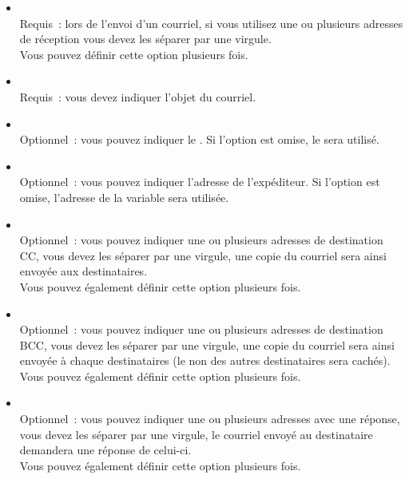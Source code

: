 \begin {itemize}
  \item [\var{-t},]  
    \\Requis~: lors de l'envoi d'un courriel, si vous utilisez une ou
	plusieurs adresses de réception vous devez les séparer par une virgule.
	\\Vous pouvez définir cette option plusieurs fois.

  \item [\var{-s},]  
    \\Requis~: vous devez indiquer l'objet du courriel.

  \item [\var{-A},]  
    \\Optionnel~: vous pouvez indiquer le .
	Si l'option est omise, le  
	sera utilisé.

  \item [\var{-f},]  
    \\Optionnel~: vous pouvez indiquer l'adresse de l'expéditeur.
	Si l'option est omise, l'adresse de la variable
	 sera utilisée.

  \item [\var{-c},]  
    \\Optionnel~: vous pouvez indiquer une ou plusieurs adresses de destination CC,
	vous devez les séparer par une virgule, une copie du courriel sera ainsi
	envoyée aux destinataires.
	\\Vous pouvez également définir cette option plusieurs fois.

  \item [\var{-b},]  
    \\Optionnel~: vous pouvez indiquer une ou plusieurs adresses de destination BCC,
	vous devez les séparer par une virgule, une copie du courriel sera ainsi
	envoyée à chaque destinataires (le non des autres destinataires sera cachés).
	\\Vous pouvez également définir cette option plusieurs fois.

  \item [\var{-r},]  
    \\Optionnel~: vous pouvez indiquer une ou plusieurs adresses avec une réponse,
	vous devez les séparer par une virgule, le courriel envoyé au destinataire
	demandera une réponse de celui-ci.
	\\Vous pouvez également définir cette option plusieurs fois.


\end{itemize}
